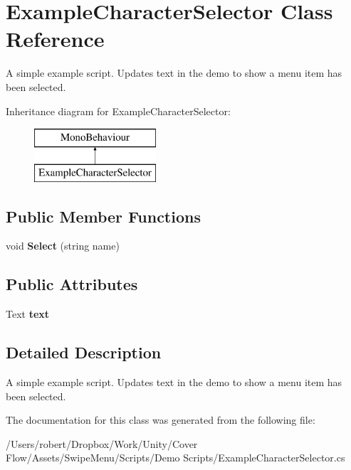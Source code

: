 \hypertarget{class_example_character_selector}{}\section{Example\+Character\+Selector Class Reference}
\label{class_example_character_selector}


A simple example script. Updates text in the demo to show a menu item has been selected.  


Inheritance diagram for Example\+Character\+Selector\+:\begin{figure}[H]
\begin{center}
\leavevmode
\includegraphics[height=2.000000cm]{class_example_character_selector}
\end{center}
\end{figure}
\subsection*{Public Member Functions}
\begin{DoxyCompactItemize}
\item 
\hypertarget{class_example_character_selector_a65aaf3a83a978133f25731bee918066c}{}void {\bfseries Select} (string name)\label{class_example_character_selector_a65aaf3a83a978133f25731bee918066c}

\end{DoxyCompactItemize}
\subsection*{Public Attributes}
\begin{DoxyCompactItemize}
\item 
\hypertarget{class_example_character_selector_a8861aa0879d8bd29985900f7692616f4}{}Text {\bfseries text}\label{class_example_character_selector_a8861aa0879d8bd29985900f7692616f4}

\end{DoxyCompactItemize}


\subsection{Detailed Description}
A simple example script. Updates text in the demo to show a menu item has been selected. 



The documentation for this class was generated from the following file\+:\begin{DoxyCompactItemize}
\item 
/\+Users/robert/\+Dropbox/\+Work/\+Unity/\+Cover Flow/\+Assets/\+Swipe\+Menu/\+Scripts/\+Demo Scripts/Example\+Character\+Selector.\+cs\end{DoxyCompactItemize}
